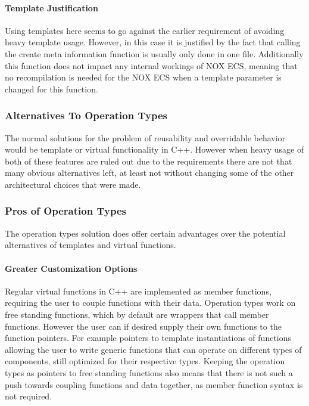 

\paragraph{Template Justification}
Using templates here seems to go against the earlier requirement of avoiding heavy template usage.
However, in this case it is justified by the fact that calling the create meta information function is usually only done in one file.
Additionally this function does not impact any internal workings of NOX ECS, meaning that no recompilation is needed for the NOX ECS when
a template parameter is changed for this function.

\subsubsection{Alternatives To Operation Types}
The normal solutions for the problem of reusability and overridable behavior would be template or virtual
functionality in C++. However when heavy usage of both of these features are ruled out due to the requirements there are not that many obvious alternatives left,
at least not without changing some of the other architectural choices that were made.

\subsubsection{Pros of Operation Types}
The operation types solution does offer certain advantages over the potential alternatives of templates and virtual functions.

\paragraph{Greater Customization Options}
Regular virtual functions in C++ are implemented as member functions, requiring the user to couple functions with their data.
Operation types work on free standing functions, which by default are wrappers that call member functions.
However the user can if desired supply their own functions to the function pointers. For example pointers to template
instantiations of functions allowing the user to write generic functions that can operate on different types of components,
still optimized for their respective types.
Keeping the operation types as pointers to free standing functions also means that there is not such a push towards
coupling functions and data together, as member function syntax is not required.

